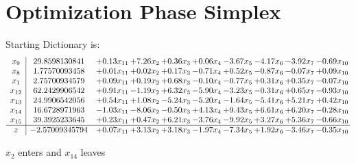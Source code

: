 \documentclass[9pt]{article}
\begin{document}
\section{Optimization Phase Simplex}
Starting Dictionary is:
\[\begin{array}{c| c c@{\hskip 2pt} c@{\hskip 2pt} c@{\hskip 2pt} c@{\hskip 2pt} c@{\hskip 2pt} c@{\hskip 2pt} c@{\hskip 2pt} c@{\hskip 2pt} }
 x_{9}   &  29.8598130841 & +  0.13 x_{11} & +  7.26 x_{2} & +  0.36 x_{3} & +  0.06 x_{4} & -3.67 x_{5} & -4.17 x_{6} & -3.92 x_{7} & -0.69 x_{10}\\
 x_{8}   &  1.77570093458 & +  0.01 x_{11} & +  0.02 x_{2} & +  0.17 x_{3} & -0.71 x_{4} & +  0.52 x_{5} & -0.87 x_{6} & -0.07 x_{7} & +  0.09 x_{10}\\
 x_{1}   &  2.75700934579 & +  0.09 x_{11} & +  0.19 x_{2} & +  0.68 x_{3} & -0.10 x_{4} & -0.77 x_{5} & +  0.31 x_{6} & +  0.35 x_{7} & -0.07 x_{10}\\
 x_{12}   &  62.2429906542 & +  0.91 x_{11} & -1.19 x_{2} & +  6.32 x_{3} & -5.90 x_{4} & -3.23 x_{5} & -0.31 x_{6} & +  0.65 x_{7} & -0.93 x_{10}\\
 x_{13}   &  24.9906542056 & +  0.54 x_{11} & +  1.08 x_{2} & -5.24 x_{3} & -5.20 x_{4} & -1.64 x_{5} & -5.41 x_{6} & +  5.21 x_{7} & +  0.42 x_{10}\\
 x_{14}   &  16.6728971963 & -1.03 x_{11} & -8.06 x_{2} & -0.50 x_{3} & +  4.13 x_{4} & +  9.43 x_{5} & +  6.61 x_{6} & +  6.20 x_{7} & -0.28 x_{10}\\
 x_{15}   &  39.3925233645 & +  0.23 x_{11} & +  0.47 x_{2} & +  6.21 x_{3} & -3.76 x_{4} & -9.92 x_{5} & +  3.27 x_{6} & +  5.36 x_{7} & -0.66 x_{10}\\
\hline
z    &  -2.57009345794 & +  0.07 x_{11} & +  3.13 x_{2} & +  3.18 x_{3} & -1.97 x_{4} & -7.34 x_{5} & +  1.92 x_{6} & -3.46 x_{7} & -0.35 x_{10}\\
\end{array}\]


 $ x_{2} $ enters and $ x_{14} $ leaves 
\end{document}
